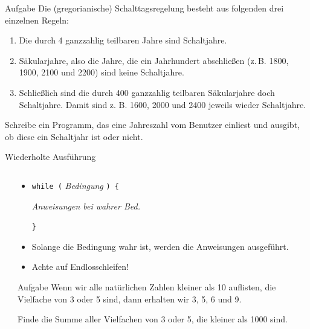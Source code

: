 \documentclass[
  aspectratio=1610,
]{beamer}
\begin{document}
\begin{frame}
  \begin{block}{Aufgabe}
    Die (gregorianische) Schalttagsregelung besteht aus folgenden drei einzelnen Regeln:
    \begin{enumerate}
      \item Die durch 4 ganzzahlig teilbaren Jahre sind Schaltjahre.
      \item Säkularjahre, also die Jahre, die ein Jahrhundert abschließen (z.\,B. 1800,
        1900, 2100 und 2200) sind keine Schaltjahre.
      \item Schließlich sind die durch 400 ganzzahlig teilbaren Säkularjahre doch
        Schaltjahre. Damit sind z. B. 1600, 2000 und 2400 jeweils wieder Schaltjahre.
    \end{enumerate}

    Schreibe ein Programm, das eine Jahreszahl vom Benutzer einliest und ausgibt, ob diese
    ein Schaltjahr ist oder nicht.
  \end{block}
\end{frame}

\begin{frame}{Wiederholte Ausführung}
  \begin{columns}[T]
    \begin{column}{0.5\textwidth}
      \inputminted[tabsize=4]{c}{schleife.c}
    \end{column}
    \begin{column}{0.5\textwidth}
      \pause

      \begin{itemize}
        \item \texttt{while (} %
          \textit{Bedingung}
          \texttt{) \{} %

          \quad\textit{Anweisungen bei wahrer Bed.}

          \texttt{\}}

        \item Solange die Bedingung wahr ist, werden die Anweisungen ausgeführt.

        \item Achte auf Endlosschleifen!
      \end{itemize}

      \begin{block}{Aufgabe}
        Wenn wir alle natürlichen Zahlen kleiner als 10 auflisten, die Vielfache von 3
        oder 5 sind, dann erhalten wir 3, 5, 6 und 9.\medskip

        Finde die Summe aller Vielfachen von 3 oder 5, die kleiner als 1000 sind.
      \end{block}

    \end{column}
  \end{columns}
\end{frame}
\end{document}
